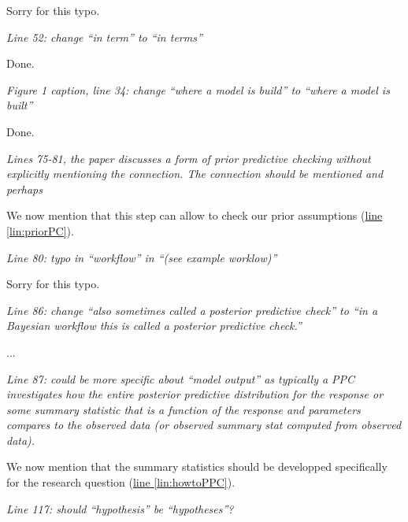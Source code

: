 \documentclass[11pt,letter]{article}
\begin{document}
Sorry for this typo.

\begin{mybox}
\emph{Line 52: change “in term” to “in terms”}
\end{mybox}

Done.

\begin{mybox}
\emph{Figure 1 caption, line 34: change “where a model is build” to “where a model is built”}
\end{mybox}

Done.

\begin{mybox}
\emph{Lines 75-81, the paper discusses a form of prior predictive checking without explicitly mentioning the connection. The connection should be mentioned and perhaps}
\end{mybox}

We now mention that this step can allow to check our prior assumptions (\href{file:forecastflows_r1\#lintarget:priorPC}{line \ref*{lin:priorPC}}).

\begin{mybox}
\emph{Line 80: typo in “workflow” in “(see example worklow)”}
\end{mybox}

Sorry for this typo.

\begin{mybox}
\emph{Line 86: change “also sometimes called a posterior predictive check” to “in a Bayesian workflow this is called a posterior predictive check.”}
\end{mybox}

...

\begin{mybox}
\emph{Line 87: could be more specific about “model output” as typically a PPC investigates how the entire posterior predictive distribution for the response or some summary statistic that is a function of the response and parameters compares to the observed data (or observed summary stat computed from observed data).}
\end{mybox}

We now mention that the summary statistics should be developped specifically for the research question (\href{file:forecastflows_r1\#lintarget:howtoPPC}{line \ref*{lin:howtoPPC}}). %

\begin{mybox}
\emph{Line 117: should “hypothesis” be “hypotheses”?}
\end{mybox}
\end{document}
